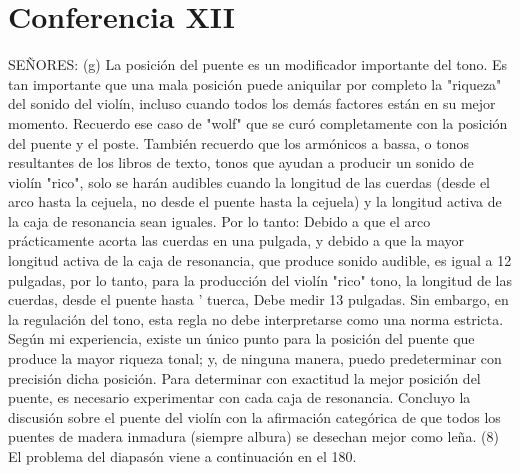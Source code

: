 \chapter*{Conferencia XII}
SEÑORES: (g) La posición del puente es un modificador importante del tono. Es tan importante que una mala posición puede aniquilar por completo la "riqueza" del sonido del violín, incluso cuando todos los demás factores están en su mejor momento. Recuerdo ese caso de "wolf" que se curó completamente con la posición del puente y el poste. También recuerdo que los armónicos a bassa, o tonos resultantes de los libros de texto, tonos que ayudan a producir un sonido de violín "rico", solo se harán audibles cuando la longitud de las cuerdas (desde el arco hasta la cejuela, no desde el puente hasta la cejuela) y la longitud activa de la caja de resonancia sean iguales. Por lo tanto: Debido a que el arco prácticamente acorta las cuerdas en una pulgada, y debido a que la mayor longitud activa de la caja de resonancia, que produce sonido audible, es igual a 12 pulgadas, por lo tanto, para la producción del violín "rico"
tono, la longitud de las cuerdas, desde el puente hasta '
tuerca,
Debe medir 13 pulgadas. Sin embargo, en la regulación del tono, esta regla no debe interpretarse como una norma estricta. Según mi experiencia, existe un único punto para la posición del puente que produce la mayor riqueza tonal; y, de ninguna manera, puedo predeterminar con precisión dicha posición. Para determinar con exactitud la mejor posición del puente, es necesario experimentar con cada caja de resonancia.
Concluyo la discusión sobre el puente del violín con la afirmación categórica de que todos los puentes de madera inmadura (siempre albura) se desechan mejor como
leña.
(8)	El problema del diapasón viene a continuación en el 180.

